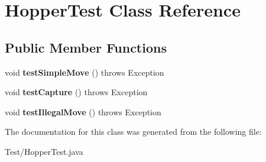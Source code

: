\hypertarget{class_hopper_test}{}\section{Hopper\+Test Class Reference}
\label{class_hopper_test}
\subsection*{Public Member Functions}
\begin{DoxyCompactItemize}
\item 
\hypertarget{class_hopper_test_accb0b9246afedc2cbaa1da02734a2456}{}void {\bfseries test\+Simple\+Move} ()  throws Exception \label{class_hopper_test_accb0b9246afedc2cbaa1da02734a2456}

\item 
\hypertarget{class_hopper_test_ac2df8ef8e7c775e01fc61ea396b9d32e}{}void {\bfseries test\+Capture} ()  throws Exception \label{class_hopper_test_ac2df8ef8e7c775e01fc61ea396b9d32e}

\item 
\hypertarget{class_hopper_test_a15310aece7aa8d72330606f185dba541}{}void {\bfseries test\+Illegal\+Move} ()  throws Exception \label{class_hopper_test_a15310aece7aa8d72330606f185dba541}

\end{DoxyCompactItemize}


The documentation for this class was generated from the following file\+:\begin{DoxyCompactItemize}
\item 
Test/Hopper\+Test.\+java\end{DoxyCompactItemize}
